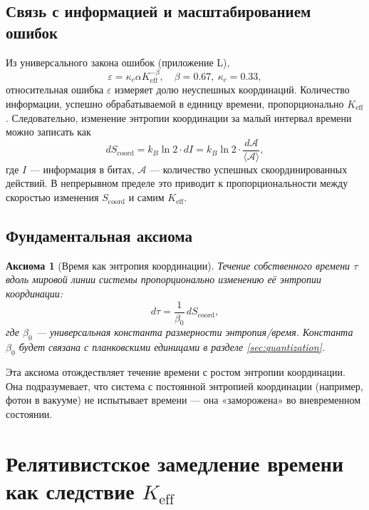 \documentclass[12pt,a4paper]{article}
\newtheorem{axiom}[theorem]{Аксиома}
\newcommand{\Keff}{K_{\mathrm{eff}}}
\newcommand{\kappac}{\kappa_c}
\newcommand{\Scoord}{S_{\mathrm{coord}}}
\begin{document}
	\subsection{Связь с информацией и масштабированием ошибок}
	
	Из универсального закона ошибок (приложение L),
	\begin{equation}
		\varepsilon = \kappac \alpha \Keff^{-\beta}, \quad \beta = 0.67,\ \kappac = 0.33,
	\end{equation}
	относительная ошибка \(\varepsilon\) измеряет долю неуспешных координаций. Количество информации, успешно обрабатываемой в единицу времени, пропорционально \(\Keff\). Следовательно, изменение энтропии координации за малый интервал времени можно записать как
	\begin{equation}
		d\Scoord = k_B \ln 2 \cdot dI = k_B \ln 2 \cdot \frac{d\mathcal{A}}{\langle \mathcal{A} \rangle},
	\end{equation}
	где \(I\) — информация в битах, \(\mathcal{A}\) — количество успешных скоординированных действий. В непрерывном пределе это приводит к пропорциональности между скоростью изменения \(\Scoord\) и самим \(\Keff\).
	
	\subsection{Фундаментальная аксиома}
	
	\begin{axiom}[Время как энтропия координации]
		Течение собственного времени \(\tau\) вдоль мировой линии системы пропорционально изменению её энтропии координации:
		\begin{equation}
			d\tau = \frac{1}{\beta_0} \, d\Scoord,
			\label{eq:time_entropy}
		\end{equation}
		где \(\beta_0\) — универсальная константа размерности энтропия/время. Константа \(\beta_0\) будет связана с планковскими единицами в разделе \ref{sec:quantization}.
	\end{axiom}
	
	Эта аксиома отождествляет течение времени с ростом энтропии координации. Она подразумевает, что система с постоянной энтропией координации (например, фотон в вакууме) не испытывает времени — она «заморожена» во вневременном состоянии.
	
	\section{Релятивистское замедление времени как следствие \texorpdfstring{\(\Keff\)}{Keff}}
	\label{sec:sr}
	
\end{document}
